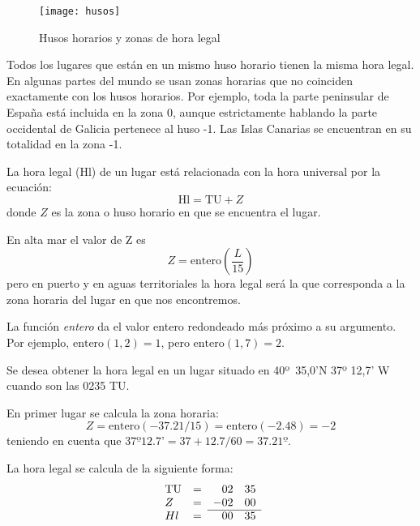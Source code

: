 \begin{figure}[hbtp]
\begin{center}
\texttt{[image: husos]}\\
\caption{Husos horarios y zonas de hora legal}
\label{fg:husos}
\end{center}
\end{figure}

Todos los lugares que están en un mismo huso horario tienen la misma hora legal. En algunas partes del mundo se usan zonas horarias que no coinciden exactamente con los husos horarios. Por ejemplo, toda la parte peninsular de España está incluida en la zona 0, aunque estrictamente hablando la parte occidental de Galicia pertenece al huso -1. Las Islas Canarias se encuentran en su totalidad en la zona -1. 

La hora legal (Hl) de un lugar está relacionada con la hora universal por la ecuación: 
\begin{equation}
\textrm{Hl} = \mathrm{TU} + Z
\end{equation}
donde $Z$ es la zona o huso horario en que se encuentra el lugar. 

En alta mar el valor de Z es 
\begin{equation}
Z = \mathrm{entero}\left(\frac{L}{15}\right)
\end{equation}
pero en puerto y en aguas territoriales la hora legal será la que corresponda a la zona horaria del lugar en que nos encontremos.

La función \textit{entero} da el valor entero redondeado más próximo a su argumento.  Por ejemplo, 
$\mathrm{entero}(1,2) = 1$, pero $\mathrm{entero}(1,7) = 2$.

\begin{ejemplo}
Se desea obtener la hora legal en un lugar situado en \mbox{40º 35,0’\:N} 37º 12,7’ W cuando son las 0235 TU.

En primer lugar se calcula la zona horaria:
\[ Z  = \mathrm{entero}(-37.21/15)  =  \mathrm{entero}(-2.48) =  -2 \]
teniendo en cuenta que $ 37º 12.7’ = 37+12.7/60 = 37.21º $.

 La hora legal se calcula de la siguiente forma:
\[
\begin{array}{lcrr}
  \mathrm{TU} & =  &  02 & 35 \\
  Z                     & = &   -02 &00 \\ \cline{3-4}
  Hl                    & = & 00 & 35
\end{array} 
\]

\end{ejemplo}

